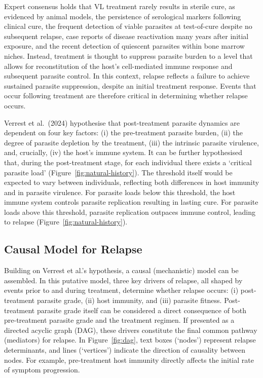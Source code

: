 Expert consensus holds that VL treatment rarely results in sterile cure, as evidenced by animal models\cite{murray1996}, the persistence of serological markers following clinical cure\cite{gidwani2011}, the frequent detection of viable parasites at test-of-cure despite no subsequent relapse\cite{verrest2021}, case reports of disease reactivation many years after initial exposure\cite{eichenberger2017, postorino2011}, and the recent detection of quiescent parasites within bone marrow niches\cite{dirkx2024}. Instead, treatment is thought to suppress parasite burden to a level that allows for reconstitution of the host's cell-mediated immune response and subsequent parasite control\cite{murray1996, khalil2005}. In this context, relapse reflects a failure to achieve sustained parasite suppression, despite an initial treatment response. Events that occur following treatment are therefore critical in determining whether relapse occurs.

Verrest et al.\ (2024)\cite{verrest2024} hypothesise that post-treatment parasite dynamics are dependent on four key factors: (i) the pre-treatment parasite burden, (ii) the degree of parasite depletion by the treatment, (iii) the intrinsic parasite virulence, and, crucially, (iv) the host's immune system. It can be further hypothesised that, during the post-treatment stage, for each individual there exists a `critical parasite load' (Figure~\ref{fig:natural-history}). The threshold itself would be expected to vary between individuals, reflecting both differences in host immunity and in parasite virulence. For parasite loads below this threshold, the host immune system controls parasite replication resulting in lasting cure. For parasite loads above this threshold, parasite replication outpaces immune control, leading to relapse (Figure~\ref{fig:natural-history}).

\subsection{Causal Model for Relapse\label{sec:causal_model}}

Building on Verrest et al.'s hypothesis, a causal (mechanistic) model can be assembled. In this putative model, three key drivers of relapse, all shaped by events prior to and during treatment, determine whether relapse occurs: (i) post-treatment parasite grade, (ii) host immunity, and (iii) parasite fitness. Post-treatment parasite grade itself can be considered a direct consequence of both pre-treatment parasite grade and the treatment regimen. If presented as a directed acyclic graph (DAG), these drivers constitute the final common pathway (mediators) for relapse. In Figure~\ref{fig:dag}, text boxes (`nodes') represent relapse determinants, and lines (`vertices') indicate the direction of causality between nodes. For example, pre-treatment host immunity directly affects the initial rate of symptom progression.

